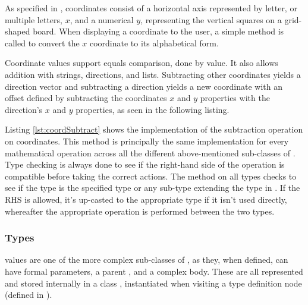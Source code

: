 As specified in , coordinates consist of
a horizontal axis represented by letter, or multiple letters, $x$, and a
numerical $y$, representing the vertical squares on a grid-shaped board.
When displaying a coordinate to the user, a simple method is called to
convert the $x$ coordinate to its alphabetical form.

Coordinate values support equals comparison, done by value. It
also allows addition with strings, directions, and lists. Subtracting
other coordinates yields a direction vector and subtracting a direction
yields a new coordinate with an offset defined by subtracting the
coordinates $x$ and $y$ properties with the direction's $x$ and $y$
properties, as seen in the following listing.



Listing \ref{lst:coordSubtract} shows the implementation of the
subtraction operation on coordinates. This method is principally the
same implementation for every mathematical operation across all the
different above-mentioned sub-classes of . Type checking
is always done to see if the right-hand side of the operation is
compatible before taking the correct actions. The method 
on all  types checks to see if the type is the specified
type or any sub-type extending the type in \productname{}. If the RHS
is allowed, it's up-casted to the appropriate type if it isn't used
directly, whereafter the appropriate operation is performed between the
two types.

%


\subsubsection{Types}
 values are one of the more complex sub-classes of
, as they, when defined, can have formal parameters, a
parent , and a complex body. These are all represented
and stored internally in a class , instantiated when
visiting a type definition node (defined in ).

